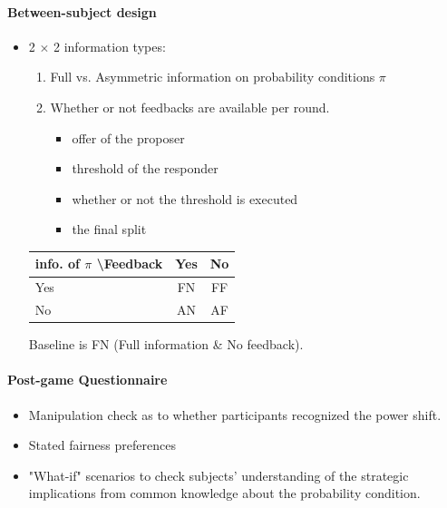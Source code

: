 \documentclass[../root]{subfiles}
\begin{document}
    \paragraph{Between-subject design}

    \begin{itemize}
      \item 2 $\times$ 2 information types:
      \begin{enumerate}
        \item Full vs. Asymmetric information on probability conditions $\pi$
        \item Whether or not feedbacks are available per round.
        \begin{itemize}
          \item offer of the proposer
          \item threshold of the responder
          \item whether or not the threshold is executed
          \item the final split
        \end{itemize}
      \end{enumerate}

      \begin{table}
        \centering
        \begin{tabular}{lcc}\hline \hline
          info. of $\pi$ \textbackslash Feedback & Yes  & No \\ \hline
          Yes & FN & FF \\
          No & AN & AF \\ \hline \hline
        \end{tabular}

        Baseline is FN (Full information \& No feedback).
      \end{table}
    \end{itemize}

    \paragraph{Post-game Questionnaire}

    \begin{itemize}
      \item Manipulation check as to whether participants recognized the power shift.
      \item Stated fairness preferences
      \item "What-if" scenarios to check subjects' understanding of the strategic implications from common knowledge about the probability condition.
    \end{itemize}
\end{document}
